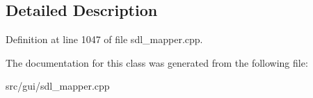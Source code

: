 \subsection{Detailed Description}


Definition at line 1047 of file sdl\-\_\-mapper.\-cpp.



The documentation for this class was generated from the following file\-:\begin{DoxyCompactItemize}
\item 
src/gui/sdl\-\_\-mapper.\-cpp\end{DoxyCompactItemize}
